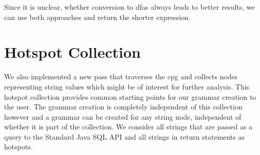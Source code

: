 Since it is unclear, whether conversion to \acp{dfa} always leads to better results, we can use both approaches and return the shorter expression.

% 


\section{Hotspot Collection} 
We also implemented a new pass that traverses the \ac{cpg} and collects nodes representing string values which might be of interest for further analysis. 
This hotspot collection provides common starting points for our grammar creation to the user. The grammar creation is completely independent of this collection however and a grammar can be created for any string node, independent of whether it is part of the collection.
We consider all strings that are passed as a query to the Standard Java SQL API and all strings in return statements as hotspots.
